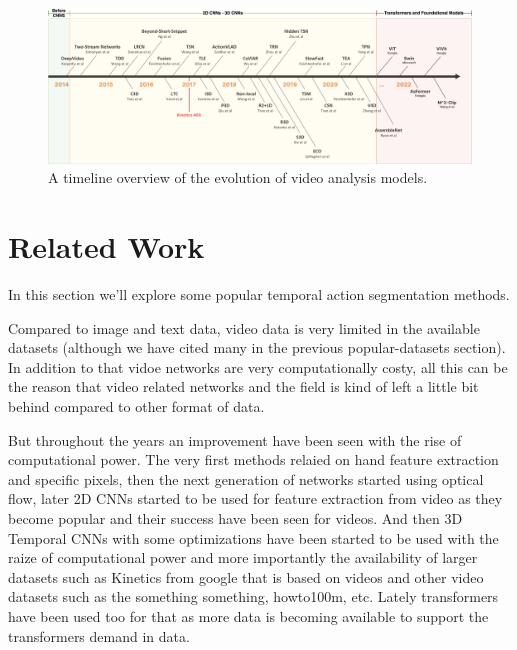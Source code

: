 \begin{figure}[t]
    \centering
    \includegraphics[width=\textwidth, height=0.25\textwidth]{../../assets/figures/extended-video-timeline-v3.png}
    \caption{A timeline overview of the evolution of video analysis models.}
    \label{fig:your-label}
\end{figure}

\section{Related Work}


In this section we'll explore some popular temporal action segmentation methods.

Compared to image and text data, video data is very limited in the available datasets (although we have cited many in the previous popular-datasets section). In addition to that vidoe networks are very computationally costy, all this can be the reason that video related networks and the field is kind of left a little bit behind compared to other format of data.

But throughout the years an improvement have been seen with the rise of computational power. The very first methods relaied on hand feature extraction and specific pixels, then the next generation of networks started using optical flow, later 2D CNNs started to be used for feature extraction from video as they become popular and their success have been seen for videos. And then 3D Temporal CNNs with some optimizations have been started to be used with the raize of computational power and more importantly the 
availability of larger datasets such as Kinetics from google that is based on videos and other video datasets such as the something something, howto100m, etc. Lately transformers have been used too for that as more data is becoming available to support the transformers demand in data.

